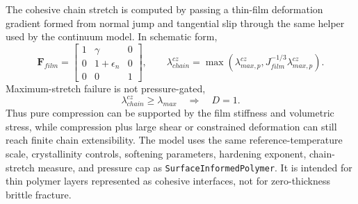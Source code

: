 The cohesive chain stretch is computed by passing a thin-film deformation gradient formed from normal jump and tangential slip through the same helper used by the continuum model.  In schematic form,
\begin{equation}
  \mathbf F_{film}=\begin{bmatrix}
    1 & \gamma & 0\\
    0 & 1+\epsilon_n & 0\\
    0 & 0 & 1
  \end{bmatrix},
  \qquad
  \lambda_{chain}^{cz}=\max\left(\lambda_{max,p}^{cz}, J_{film}^{-1/3}\lambda_{max,p}^{cz}\right).
\end{equation}
Maximum-stretch failure is not pressure-gated,
\begin{equation}
  \lambda_{chain}^{cz}\ge \lambda_{max}\quad\Rightarrow\quad D=1.
  \label{eq:surface-polymer-cz-failure}
\end{equation}
Thus pure compression can be supported by the film stiffness and volumetric stress, while compression plus large shear or constrained deformation can still reach finite chain extensibility.  The model uses the same reference-temperature scale, crystallinity controls, softening parameters, hardening exponent, chain-stretch measure, and pressure cap as \texttt{SurfaceInformedPolymer}.  It is intended for thin polymer layers represented as cohesive interfaces, not for zero-thickness brittle fracture.


